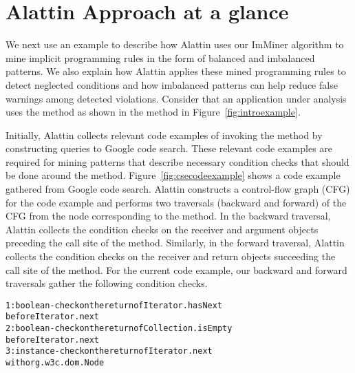 \section{Alattin Approach at a glance}
\label{sec:example}

We next use an example to describe how Alattin uses our ImMiner algorithm
to mine implicit programming rules in the form of balanced and imbalanced patterns.
We also explain how Alattin applies these mined programming rules to detect neglected conditions
and how imbalanced patterns can help reduce false warnings among detected violations.
Consider that an application under analysis uses the  method as shown in the  method in Figure~\ref{fig:introexample}. 

Initially, Alattin collects relevant code examples of invoking the 
method by constructing queries to Google code search. These relevant code examples
are required for mining patterns that describe necessary 
condition checks that should be done around the  method.
Figure~\ref{fig:csecodeexample} shows a code example gathered from Google code search.
Alattin constructs a control-flow graph (CFG) for the code example
and performs two traversals (backward and forward) of the CFG
from the node corresponding to the  method. In the backward traversal,
Alattin collects the condition checks on the receiver and 
argument objects preceding the call site of the  method.
Similarly, in the forward traversal, Alattin collects
the condition checks on the receiver and return objects 
succeeding the call site of the  method.
For the current code example, our backward and forward traversals gather
the following condition checks.

\begin{CodeOut}
\begin{alltt}
\hspace*{0.1in}1: boolean-check on the return of Iterator.hasNext 
\hspace*{0.5in}before Iterator.next 
\hspace*{0.1in}2: boolean-check on the return of Collection.isEmpty 
\hspace*{0.5in}before Iterator.next 
\hspace*{0.1in}3: instance-check on the return of Iterator.next 
\hspace*{0.5in}with org.w3c.dom.Node
\end{alltt}
\end{CodeOut}

